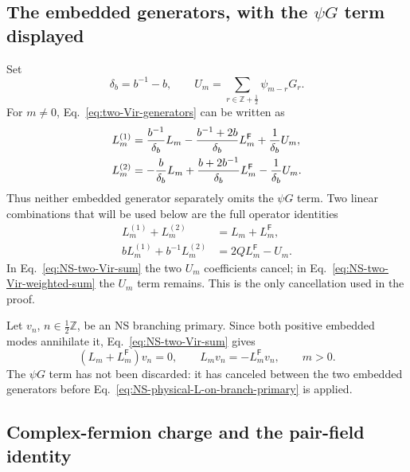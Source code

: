 \documentclass[11pt]{article}
\newcommand{\Ff}{\mathsf F}
\begin{document}
\subsection{The embedded generators, with the \texorpdfstring{\(\psi G\)}{psi G}
term displayed}

Set
\begin{equation}
 \delta_b=b^{-1}-b,
 \qquad
 U_m=\sum_{r\in\mathbb Z+\frac12}\psi_{m-r}G_r.
 \label{eq:NS-U-definition}
\end{equation}
For \(m\ne0\), Eq.~\eqref{eq:two-Vir-generators} can be written as
\begin{align}
 L_m^{(1)}
 &=\frac{b^{-1}}{\delta_b}L_m
   -\frac{b^{-1}+2b}{\delta_b}L_m^{\Ff}
   +\frac1{\delta_b}U_m,
 \notag\\
 L_m^{(2)}
 &=-\frac b{\delta_b}L_m
   +\frac{b+2b^{-1}}{\delta_b}L_m^{\Ff}
   -\frac1{\delta_b}U_m.
 \label{eq:NS-two-Vir-U-explicit}
\end{align}
Thus neither embedded generator separately omits the \(\psi G\) term.  Two
linear combinations that will be used below are the full operator
identities
\begin{align}
 L_m^{(1)}+L_m^{(2)}
 &=L_m+L_m^{\Ff},
 \label{eq:NS-two-Vir-sum}\\
 bL_m^{(1)}+b^{-1}L_m^{(2)}
 &=2Q L_m^{\Ff}-U_m.
 \label{eq:NS-two-Vir-weighted-sum}
\end{align}
In Eq.~\eqref{eq:NS-two-Vir-sum} the two \(U_m\) coefficients cancel;
in Eq.~\eqref{eq:NS-two-Vir-weighted-sum} the \(U_m\) term remains.  This is
the only cancellation used in the proof.

Let \(v_n\), \(n\in\frac12\mathbb Z\), be an NS branching primary.  Since
both positive embedded modes annihilate it, Eq.~\eqref{eq:NS-two-Vir-sum}
gives
\begin{equation}
 (L_m+L_m^{\Ff})v_n=0,
 \qquad
 L_mv_n=-L_m^{\Ff}v_n,
 \qquad m>0.
 \label{eq:NS-physical-L-on-branch-primary}
\end{equation}
The \(\psi G\) term has not been discarded: it has canceled between the two
embedded generators before Eq.~\eqref{eq:NS-physical-L-on-branch-primary}
is applied.

\subsection{Complex-fermion charge and the pair-field identity}
\end{document}
